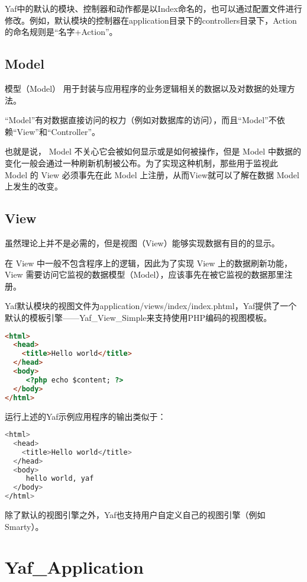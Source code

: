 Yaf中的默认的模块、控制器和动作都是以Index命名的，也可以通过配置文件进行修改。例如，默认模块的控制器在application目录下的controllers目录下，Action的命名规则是“名字+Action”。

\section{Model}

模型（Model） 用于封装与应用程序的业务逻辑相关的数据以及对数据的处理方法。

“Model”有对数据直接访问的权力（例如对数据库的访问），而且“Model”不依赖“View”和“Controller”。

也就是说， Model 不关心它会被如何显示或是如何被操作，但是 Model 中数据的变化一般会通过一种刷新机制被公布。为了实现这种机制，那些用于监视此 Model 的 View 必须事先在此 Model 上注册，从而View就可以了解在数据 Model 上发生的改变。




\section{View}

虽然理论上并不是必需的，但是视图（View）能够实现数据有目的的显示。

在 View 中一般不包含程序上的逻辑，因此为了实现 View 上的数据刷新功能，View 需要访问它监视的数据模型（Model），应该事先在被它监视的数据那里注册。




Yaf默认模块的视图文件为application/views/index/index.phtml，Yaf提供了一个默认的模板引擎——Yaf\_View\_Simple来支持使用PHP编码的视图模板。

\begin{lstlisting}[language=HTML]
<html>
  <head>
    <title>Hello world</title>
  </head>
  <body>
     <?php echo $content; ?>
  </body>
</html>
\end{lstlisting}

运行上述的Yaf示例应用程序的输出类似于：


\begin{lstlisting}[language=bash]
<html>
  <head>
    <title>Hello world</title>
  </head>
  <body>
     hello world, yaf
  </body>
</html>
\end{lstlisting}

除了默认的视图引擎之外，Yaf也支持用户自定义自己的视图引擎（例如Smarty）。

\chapter{Yaf\_Application}

